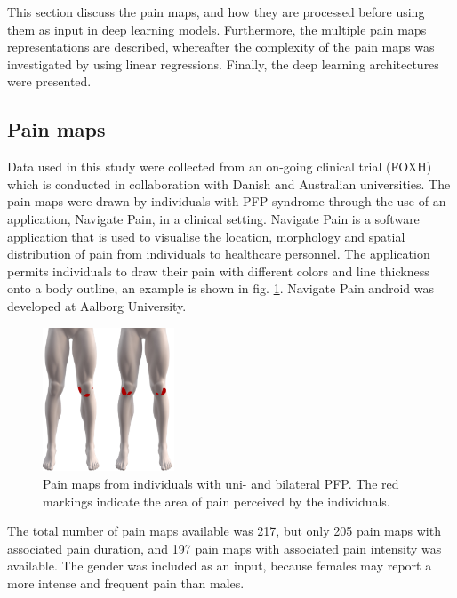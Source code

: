 This section discuss the pain maps, and how they are processed before using them as input in deep learning models. Furthermore, the multiple pain maps representations are described, whereafter the complexity of the pain maps was investigated by using linear regressions. Finally, the deep learning architectures were presented.

\subsection*{\textbf{Pain maps}}
Data used in this study were collected from an on-going clinical trial (FOXH) which is conducted in collaboration with Danish and Australian universities. The pain maps were drawn by individuals with PFP syndrome through the use of an application, Navigate Pain, in a clinical setting. \newline
\noindent
Navigate Pain is a software application that is used to visualise the location, morphology and spatial distribution of pain from individuals to healthcare personnel. The application permits individuals to draw their pain with different colors and line thickness onto a body outline, an example is shown in fig. \ref{fig:twoPainmaps}. Navigate Pain android was developed at Aalborg University.\citep{Solutions2015}

\begin{figure}[H]
\centering
\includegraphics[width=0.35\textwidth]{Figures/twoPainmaps}
\caption{Pain maps from individuals with uni- and bilateral PFP. The red markings indicate the area of pain perceived by the individuals.}
\label{fig:twoPainmaps}
\end{figure}

\noindent
The total number of pain maps available was 217, but only 205 pain maps with associated pain duration, and 197 pain maps with associated pain intensity was available. The gender was included as an input, because females may report a more intense and frequent pain than males. 


